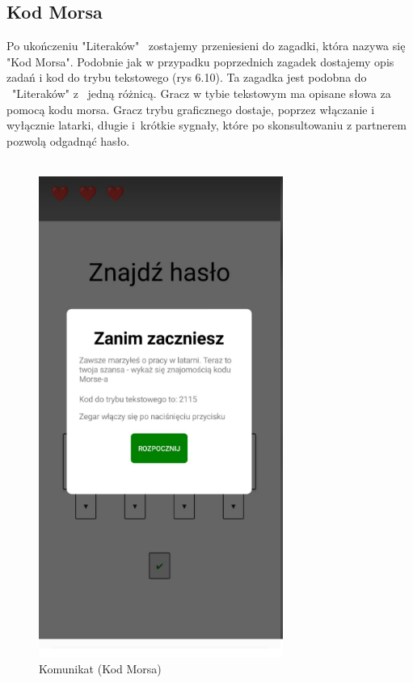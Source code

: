\subsection{Kod Morsa}
Po ukończeniu "Literaków"~ zostajemy przeniesieni do zagadki, która nazywa się "Kod Morsa". Podobnie jak w przypadku poprzednich zagadek dostajemy opis zadań i kod do trybu tekstowego (rys 6.10). Ta zagadka jest podobna do ~"Literaków" z~ jedną różnicą. Gracz w tybie tekstowym ma opisane słowa za pomocą kodu morsa. Gracz trybu graficznego dostaje, poprzez włączanie i wyłącznie latarki, długie i~krótkie sygnały, które po skonsultowaniu z partnerem pozwolą odgadnąć hasło. 
\\
\\
	\begin{figure}[!htb]
	\begin{center}
		\includegraphics[width=8cm]{rys/opis7.png}
		\caption{Komunikat (Kod Morsa)}
		\label{rys:rysunek001}
	\end{center}
\end{figure}
